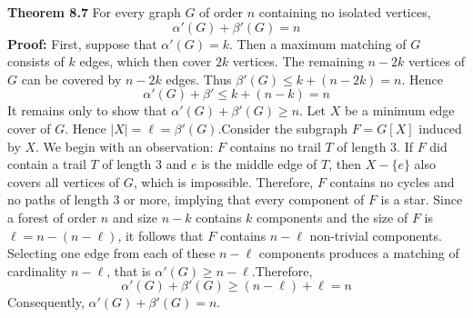 \nopagenumbers
{\bf Theorem 8.7}
\vskip 6pt
For every graph $G$ of order $n$ containing no isolated vertices, $$ \alpha '(G)+ \beta '(G)=n$$
\vskip 10pt
{\bf Proof:}
\vskip 6pt
First, suppose that $ \alpha '(G)=k$. Then a maximum matching of $G$ consists of $k$ edges, which then cover $2k$ vertices. The remaining $n-2k$ vertices of $G$ can be covered by $n-2k$ edges. Thus $ \beta '(G)
\leq k+(n-2k)=n$. Hence $$ \alpha '(G)+ \beta ' \leq k+(n - k)=n$$ It remains only to show that $ \alpha '(G)+ \beta '(G) \geq n$.
\vskip 1mm
Let $X$ be a minimum edge cover of $G$. Hence $|X|= \ell = \beta '(G)$.Consider the subgraph $F=G[X]$ induced by $X$. We begin with an observation: $F$ contains no trail $T$ of length $3$. If $F$ did contain a
trail $T$ of length $3$ and $e$ is the middle edge of $T$, then $X- \lbrace e \rbrace $ also covers all vertices of $G$, which is impossible. Therefore, $F$ contains no cycles and no paths of length $3$ or more,
implying that every component of $F$ is a star.
\vskip 1mm
Since a forest of order $n$ and size $n-k$ contains $k$ components and the size of $F$ is $ \ell =n-(n- \ell )$, it follows that $F$ contains $n- \ell $ non-trivial components. Selecting one edge from each
of these $n- \ell $ components produces a matching of cardinality $n- \ell $, that is $ \alpha '(G) \geq n- \ell $.Therefore, $$ \alpha '(G)+ \beta '(G) \geq (n - \ell ) + \ell = n$$ Consequently,
$ \alpha '(G)+ \beta '(G)=n$.

\vfill\eject
